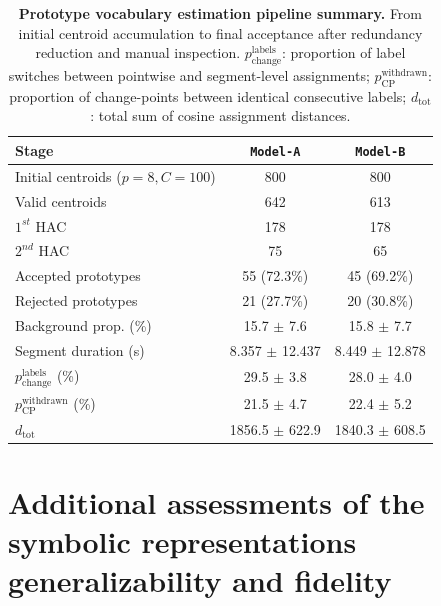 \documentclass[runningheads]{llncs}
\begin{document}
\begin{table}[!htbp]
    \centering
    \begin{tabular}{lcc}
        \toprule
        Stage & \texttt{Model-A} & \texttt{Model-B} \\
        \midrule
        Initial centroids ($p=8, C=100$) & 800 & 800 \\
        Valid centroids  & 642 & 613 \\
        $1^{st}$ HAC & 178 & 178 \\
        $2^{nd}$ HAC & 75 & 65 \\
        \midrule
        Accepted prototypes & 55 (72.3\%) & 45 (69.2\%) \\
        Rejected prototypes & 21 (27.7\%) & 20 (30.8\%) \\
        \midrule
        Background prop. (\%) & 15.7 $\pm$ 7.6 & 15.8 $\pm$ 7.7 \\
        Segment duration (s) & 8.357 $\pm$ 12.437 & 8.449 $\pm$ 12.878 \\
        $p^{\text{labels}}_{\text{change}}$ (\%) & 29.5 $\pm$ 3.8 & 28.0 $\pm$ 4.0 \\
        $p^{\text{withdrawn}}_{\text{CP}}$ (\%) & 21.5 $\pm$ 4.7 & 22.4 $\pm$ 5.2 \\
        $d_\text{tot}$ & 1856.5 $\pm$ 622.9 & 1840.3 $\pm$ 608.5 \\
        \bottomrule
    \end{tabular}
    \caption{\textbf{Prototype vocabulary estimation pipeline summary.} From initial centroid accumulation to final acceptance after redundancy reduction and manual inspection. $p^{\text{labels}}_{\text{change}}$: proportion of label switches between pointwise and segment-level assignments; $p^{\text{withdrawn}}_{\text{CP}}$: proportion of change-points between identical consecutive labels; $d_\text{tot}$: total sum of cosine assignment distances.}
    \label{tab:supp_pipeline}
\end{table}


\section{Additional assessments of the symbolic representations generalizability and fidelity}
\label{sec:supp_generalizability}

\end{document}
